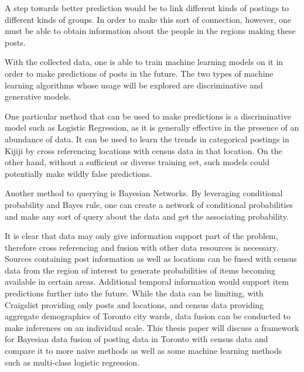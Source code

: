 \documentclass[12pt]{article}
\begin{document}
A step towards better prediction would be to link different kinds of postings to different kinds of groups. In order to make this sort of connection, however, one must be able to obtain information about the people in the regions making these posts. 


With the collected data, one is able to train machine learning models on it in order to make predictions of posts in the future. 
The two types of machine learning algorithms whose usage will be explored are discriminative and generative models. 

One particular method that can be used to make predictions is a discriminative model such as Logistic Regression, as it is generally effective in the presence of an abundance of data. It can be used to learn the trends in categorical postings in Kijiji by cross referencing locations with census data in that location. On the other hand, without a sufficient or diverse training set, such models could potentially make wildly false predictions.

Another method  to querying is Bayesian Networks. By leveraging conditional probability and Bayes rule, one can create a network of conditional probabilities and make any sort of query about the data and get the associating probability. 

It is clear that data may only give information support part of the problem, therefore cross referencing and fusion with other data resources is necessary. Sources containing post information as well as locations can be fused with census data from the region of interest to generate probabilities of items becoming available in certain areas. Additional temporal information would support item predictions further into the future. While the data can be limiting, with Craigslist providing only posts and locations, and census data providing aggregate demographics of Toronto city wards, data fusion can be conducted to make inferences on an individual scale. This thesis paper will discuss a framework for Bayesian data fusion of posting data in Toronto with census data and compare it to more naive methods as well as some machine learning methods such as multi-class logistic regression. 



\end{document}
